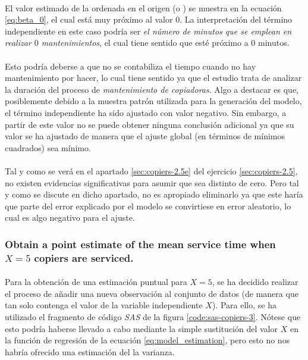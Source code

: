 \documentclass{article}
\begin{document}
        \paragraph{}
        El valor estimado de la ordenada en el origen (o ) se muestra en la ecuación \eqref{eq:beta_0}, el cual está muy próximo al valor $0$. La interpretación del término independiente en este caso podría ser \emph{el número de minutos que se emplean en realizar $0$ mantenimientos}, el cual tiene sentido que esté próximo a $0$ minutos.

        \paragraph{}
        Esto podría deberse a que no se contabiliza el tiempo cuando no hay mantenimiento por hacer, lo cual tiene sentido ya que el estudio trata de analizar la duración del proceso de \emph{mantenimiento de copiadoras}. Algo a destacar es que, posiblemente debido a la muestra patrón utilizada para la generación del modelo, el término independiente ha sido ajustado con valor negativo. Sin embargo, a partir de este valor no se puede obtener ninguna conclusión adicional ya que su valor se ha ajustado de manera que el ajuste global (en términos de mínimos cuadrados) sea mínimo.

        \paragraph{}
        Tal y como se verá en el apartado \ref{sec:copiers-2.5e} del ejercicio \ref{sec:copiers-2.5}, no existen evidencias significativas para asumir que sea distinto de cero. Pero tal y como se discute en dicho apartado, no es apropiado eliminarlo ya que este haría que parte del error explicado por el modelo se convirtiese en error aleatorio, lo cual es algo negativo para el ajuste.


      \subsubsection{Obtain a point estimate of the mean service time when $X = 5$ copiers are serviced.}

        \paragraph{}
        Para la obtención de una estimación puntual para $X=5$, se ha decidido realizar el proceso de añadir una nueva observación al conjunto de datos (de manera que tan solo contenga el valor de la variable independiente $X$). Para ello, se ha utilizado el fragmento de código \emph{SAS} de la figura \ref{code:sas-copiers-3}. Nótese que esto podría haberse llevado a cabo mediante la simple sustitución del valor $X$ en la función de regresión de la ecuación \eqref{eq:model_estimation}, pero esto no nos habría ofrecido una estimación del la varianza.
\end{document}
